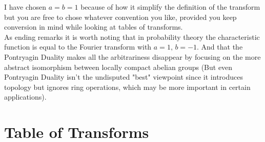 I have chosen $a=b=1$ because of how it simplify the definition of the transform but you are free to chose whatever convention you like, provided you keep conversion in mind while looking at tables of transforms.
\\

As ending remarks it is worth noting that in probability theory the characteristic function is equal to the Fourier transform with $a=1,\,b=-1$. 
And that the Pontryagin Duality makes all the arbitrariness disappear by focusing on the more abstract isomorphism between locally compact abelian groups (But even Pontryagin Duality isn't the undisputed "best" viewpoint since it introduces topology but ignores ring operations, which may be more important in certain applications).

\section{Table of Transforms}
\begin{center}
\end{center}
